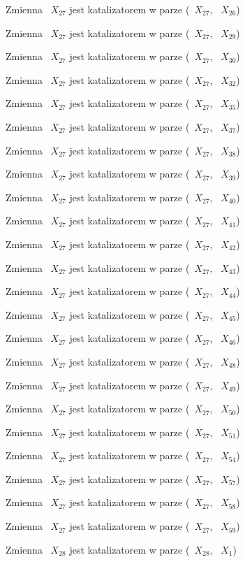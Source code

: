 \documentclass{article}
\begin{document}
Zmienna ~$X_{27}$ jest katalizatorem w parze (~$X_{27}$, ~$X_{26}$)

Zmienna ~$X_{27}$ jest katalizatorem w parze (~$X_{27}$, ~$X_{29}$)

Zmienna ~$X_{27}$ jest katalizatorem w parze (~$X_{27}$, ~$X_{30}$)

Zmienna ~$X_{27}$ jest katalizatorem w parze (~$X_{27}$, ~$X_{32}$)

Zmienna ~$X_{27}$ jest katalizatorem w parze (~$X_{27}$, ~$X_{35}$)

Zmienna ~$X_{27}$ jest katalizatorem w parze (~$X_{27}$, ~$X_{37}$)

Zmienna ~$X_{27}$ jest katalizatorem w parze (~$X_{27}$, ~$X_{38}$)

Zmienna ~$X_{27}$ jest katalizatorem w parze (~$X_{27}$, ~$X_{39}$)

Zmienna ~$X_{27}$ jest katalizatorem w parze (~$X_{27}$, ~$X_{40}$)

Zmienna ~$X_{27}$ jest katalizatorem w parze (~$X_{27}$, ~$X_{41}$)

Zmienna ~$X_{27}$ jest katalizatorem w parze (~$X_{27}$, ~$X_{42}$)

Zmienna ~$X_{27}$ jest katalizatorem w parze (~$X_{27}$, ~$X_{43}$)

Zmienna ~$X_{27}$ jest katalizatorem w parze (~$X_{27}$, ~$X_{44}$)

Zmienna ~$X_{27}$ jest katalizatorem w parze (~$X_{27}$, ~$X_{45}$)

Zmienna ~$X_{27}$ jest katalizatorem w parze (~$X_{27}$, ~$X_{46}$)

Zmienna ~$X_{27}$ jest katalizatorem w parze (~$X_{27}$, ~$X_{48}$)

Zmienna ~$X_{27}$ jest katalizatorem w parze (~$X_{27}$, ~$X_{49}$)

Zmienna ~$X_{27}$ jest katalizatorem w parze (~$X_{27}$, ~$X_{50}$)

Zmienna ~$X_{27}$ jest katalizatorem w parze (~$X_{27}$, ~$X_{51}$)

Zmienna ~$X_{27}$ jest katalizatorem w parze (~$X_{27}$, ~$X_{54}$)

Zmienna ~$X_{27}$ jest katalizatorem w parze (~$X_{27}$, ~$X_{57}$)

Zmienna ~$X_{27}$ jest katalizatorem w parze (~$X_{27}$, ~$X_{58}$)

Zmienna ~$X_{27}$ jest katalizatorem w parze (~$X_{27}$, ~$X_{59}$)

Zmienna ~$X_{28}$ jest katalizatorem w parze (~$X_{28}$, ~$X_{1}$)
\end{document}
